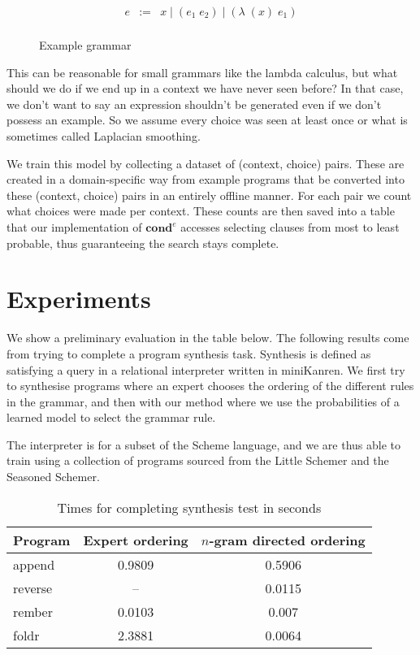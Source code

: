 \documentclass[submission,copyright,creativecommons]{eptcs}
\begin{document}
\begin{figure}
\begin{eqnarray*}
  e & := & x \; | \; (e_1 \; e_2) \; | \; (\lambda \; (x) \; e_1) \\
\end{eqnarray*}
\caption{Example grammar}
\end{figure}

This can be reasonable for small grammars like the lambda calculus, but
what should we do if we end up in a context we have never seen before?
In that case, we don't want to say an expression shouldn't be generated
even if we don't possess an example. So we assume every choice was seen
at least once or what is sometimes called Laplacian smoothing.

We train this model by collecting a dataset of (context, choice)
pairs. These are created in a domain-specific way from example
programs that be converted into these (context, choice) pairs in an
entirely offline manner. For each pair we count what choices were made
per context. These counts are then saved into a table that our
implementation of $\textbf{cond}^e$ accesses selecting clauses from
most to least probable, thus guaranteeing the search stays complete.

\section{Experiments}

We show a preliminary evaluation in the table below. The following
results come from trying to complete a program synthesis
task. Synthesis is defined as satisfying a query in a relational
interpreter written in miniKanren. We first try to synthesise programs
where an expert chooses the ordering of the different rules in the
grammar, and then with our method where we use the probabilities of
a learned model to select the grammar rule.

The interpreter is for a subset of the Scheme language, and we are
thus able to train using a collection of programs sourced from the
Little Schemer and the Seasoned Schemer.

\begin{table}[ht]
\centering
\caption{Times for completing synthesis test in seconds}
\begin{tabular}[t]{lcc}
\toprule
Program&Expert ordering&$n$-gram directed ordering\\
\midrule
append&0.9809&0.5906\\
reverse&--&0.0115\\
rember&0.0103&0.007\\
foldr&2.3881&0.0064\\
\bottomrule
\end{tabular}
\end{table}
\end{document}
